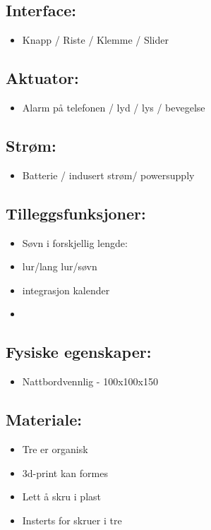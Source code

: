 \documentclass[12pt, a4paper]{article}
\begin{document}
\subsection {Interface: }
\begin{itemize}
    \item Knapp / Riste / Klemme / Slider
\end{itemize}


\subsection {Aktuator:}
\begin{itemize}
    \item Alarm på telefonen / lyd / lys / bevegelse
\end{itemize}


\subsection {Strøm: }
\begin{itemize}
    \item Batterie / indusert strøm/ powersupply
\end{itemize}



\subsection {Tilleggsfunksjoner: }
\begin{itemize}
    \item Søvn i forskjellig lengde: 
    \item lur/lang lur/søvn
    \item integrasjon kalender
    \item 
\end{itemize}



\subsection {Fysiske egenskaper: }
\begin{itemize}
    \item Nattbordvennlig - 100x100x150
\end{itemize}


\subsection {Materiale:}
\begin{itemize}
    \item Tre er organisk
    \item 3d-print kan formes
    \item Lett å skru i plast
    \item Insterts for skruer i tre
\end{itemize}
\end{document}

